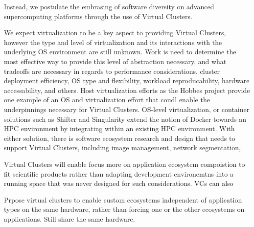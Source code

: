 Instead, we postulate the embrasing of software diversity on advanced supercomputing platforms through the use of Virtual Clusters.  




We expect virtualization to be a key aspect to providing Virtual Clusters, however the type and level of virtualization and its interactions with the underlying OS environment are still unknown.  Work is need to determine the most effective way to provide this level of abstraction necessary, and what tradeoffs are necessary in regards to performance considerations, cluster deployment efficiency, OS type and flexibility, workload reproducability, hardware accessability, and others.  Host virtualization efforts as the Hobbes project \cite{hobbes} provide one example of an OS and virtualization effort that coudl enable the underpinnings necessary for Virtual Clusters.  OS-level virtualization, or container solutions such as Shifter and Singularity \cite{shiftercug2016, singularity} extend the notion of Docker towards an HPC environment by integrating within an existing HPC environment. With either solution, there is software ecosystem research and design that needs to support Virtual Clusters, including image management, network segmentation, 


Virtual Clusters will enable focus more on application ecosystem compoistion to fit scientific products rather than adapting development environemtns into a running space that was never designed for such considerations. VCs can also  



Prpose virtual clusters to enable custom ecosystems independent of application types on the same hardware, rather than forcing one or the other ecosystems on applications. Still share the same hardware.






